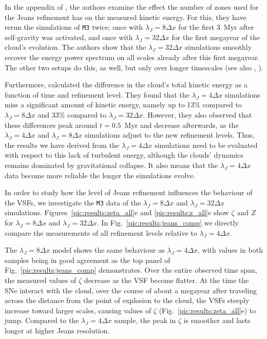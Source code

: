 \documentclass{aa}		%
\begin{document}
In the appendix of , the authors examine the effect the number of zones used for the Jeans refinement has on the measured kinetic energy.
For this, they have rerun the simulations of \texttt{M3} twice; 
once with $\lambda_J=8\Delta{}x$ for the first 3~Myr after self-gravity was activated, and once with $\lambda_J=32\Delta{}x$ for the first megayear of the cloud's evolution.
The authors show that the $\lambda_J=32\Delta{}x$ simulations smoothly recover the energy power spectrum on all scales already after this first megayear.
The other two setups do this, as well, but only over longer timescales (see also , \citealt{Seifried2017b}).

Furthermore,  calculated the difference in the cloud's total kinetic energy as a function of time and refinement level.
They found that the $\lambda_J = 4\Delta{}x$ simulations miss a significant amount of kinetic energy, namely up to 13\% compared to $\lambda_J = 8\Delta{}x$ and 33\% compared to $\lambda_J = 32\Delta{}x$.
However, they also observed that these differences peak around $t=0.5$~Myr and decrease afterwards, as the $\lambda_J = 4\Delta{}x$ and $\lambda_J = 8\Delta{}x$ simulations adjust to the new refinement levels.
Thus, the results we have derived from the $\lambda_J = 4\Delta{}x$ simulations need to be evaluated with respect to this lack of turbulent energy, although the clouds' dynamics remains dominated by gravitational collapse.
It also means that the $\lambda_J = 4\Delta{}x$ data become more reliable the longer the simulations evolve.

In order to study  how the level of Jeans refinement influences the behaviour of the VSFs, we investigate the \texttt{M3} data of the $\lambda_J = 8\Delta{}x$ and $\lambda_J = 32\Delta{}x$ simulations.
Figures~\ref{pic:results:zeta_all}e and \ref{pic:results:z_all}e show $\zeta$ and $Z$ for  $\lambda_J = 8\Delta{}x$ and $\lambda_J = 32\Delta{}x$.
In Fig.~\ref{pic:results:jeans_comp} we directly compare the measurements of all refinement levels relative to $\lambda_J = 4\Delta{}x$.

The $\lambda_J = 8\Delta{}x$ model shows the same behaviour as $\lambda_J = 4\Delta{}x$, with values in both samples being in good agreement as the top panel of Fig.~\ref{pic:results:jeans_comp} demonstrates. 
Over the entire observed time span, the measured values of $\zeta$ decrease as the VSF become flatter.
At the time the SNe interact with the cloud, over the course of about a megayear after traveling across the distance from the point of explosion to the cloud, the VSFs steeply increase toward larger scales, causing values of $\zeta$ (Fig.~\ref{pic:results:zeta_all}e) to jump.
Compared to the $\lambda_J = 4\Delta{}x$ sample, the peak in $\zeta$ is smoother and lasts longer at higher Jeans resolution.
\end{document}
